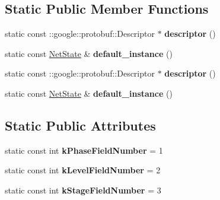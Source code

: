 \subsection*{Static Public Member Functions}
\begin{DoxyCompactItemize}
\item 
\mbox{\label{classcaffe_1_1_net_state_a9cb0ad377a939ef1bbf1defa6ea30323}} 
static const \+::google\+::protobuf\+::\+Descriptor $\ast$ {\bfseries descriptor} ()
\item 
\mbox{\label{classcaffe_1_1_net_state_ab74b56d1e5c2d1ed26d69167657430dd}} 
static const \mbox{\hyperlink{classcaffe_1_1_net_state}{Net\+State}} \& {\bfseries default\+\_\+instance} ()
\item 
\mbox{\label{classcaffe_1_1_net_state_a587126527aec8a798504a844bfe84a07}} 
static const \+::google\+::protobuf\+::\+Descriptor $\ast$ {\bfseries descriptor} ()
\item 
\mbox{\label{classcaffe_1_1_net_state_a6100f72d3e6500b68620f90c6dc55b33}} 
static const \mbox{\hyperlink{classcaffe_1_1_net_state}{Net\+State}} \& {\bfseries default\+\_\+instance} ()
\end{DoxyCompactItemize}
\subsection*{Static Public Attributes}
\begin{DoxyCompactItemize}
\item 
\mbox{\label{classcaffe_1_1_net_state_aec51f06af03aa24ebe3d0aee4af247e1}} 
static const int {\bfseries k\+Phase\+Field\+Number} = 1
\item 
\mbox{\label{classcaffe_1_1_net_state_adad9ee4b843313f3e4cbc48e080771bd}} 
static const int {\bfseries k\+Level\+Field\+Number} = 2
\item 
\mbox{\label{classcaffe_1_1_net_state_aca7871bb7de96fc748233a9fc4dc7ee3}} 
static const int {\bfseries k\+Stage\+Field\+Number} = 3
\end{DoxyCompactItemize}
